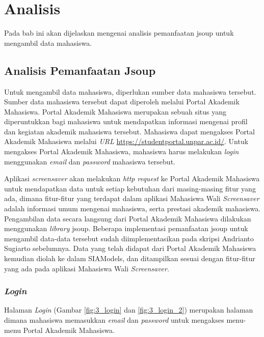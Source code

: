 \chapter{Analisis}
\label{chap:analisis}

Pada bab ini akan dijelaskan mengenai analisis pemanfaatan jsoup untuk mengambil data mahasiswa.

\section{Analisis Pemanfaatan Jsoup}
\label{analisisPemanfaatanJsoup}
Untuk mengambil data mahasiswa, diperlukan sumber data mahasiswa tersebut. Sumber data mahasiswa tersebut dapat diperoleh melalui Portal Akademik Mahasiswa. Portal Akademik Mahasiswa merupakan sebuah situs yang diperuntukkan bagi mahasiswa untuk mendapatkan informasi mengenai profil dan kegiatan akademik mahasiswa tersebut. Mahasiswa dapat mengakses Portal Akademik Mahasiswa melalui \textit{URL} \url{https://studentportal.unpar.ac.id/}. Untuk mengakses Portal Akademik Mahasiswa, mahasiswa harus melakukan \textit{login} menggunakan \textit{email} dan \textit{password} mahasiswa tersebut.

Aplikasi \textit{screensaver} akan melakukan \textit{http request} ke Portal Akademik Mahasiswa untuk mendapatkan data untuk setiap kebutuhan dari masing-masing fitur yang ada, dimana fitur-fitur yang terdapat dalam aplikasi Mahasiswa Wali \textit{Screensaver} adalah informasi umum mengenai mahasiswa, serta prestasi akademik mahasiswa. Pengambilan data secara langsung dari Portal Akademik Mahasiswa dilakukan menggunakan \textit{library} jsoup. Beberapa implementasi pemanfaatan jsoup untuk mengambil data-data tersebut sudah diimplementasikan pada skripsi Andrianto Sugiarto \cite{ifstupor} sebelumnya. Data yang telah didapat dari Portal Akademik Mahasiswa kemudian diolah ke dalam SIAModels, dan ditampilkan sesuai dengan fitur-fitur yang ada pada aplikasi Mahasiswa Wali \textit{Screensaver}.

\subsection{\textit{Login}}
Halaman \textit{Login} (Gambar \ref{fig:3_login} dan \ref{fig:3_login_2}) merupakan halaman dimana mahasiswa memasukkan \textit{email} dan \textit{password} untuk mengakses menu-menu Portal Akademik Mahasiswa.

